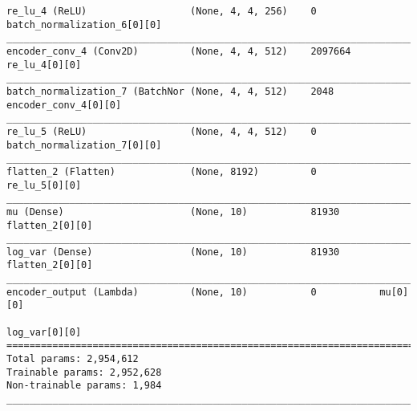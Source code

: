 \begin{lstlisting}[caption={dSprites-VAE-GAN Encoder},captionpos=b,basicstyle=\tiny, label={lst:mnist-vae-encoder}]
re_lu_4 (ReLU)                  (None, 4, 4, 256)    0           batch_normalization_6[0][0]
__________________________________________________________________________________________________
encoder_conv_4 (Conv2D)         (None, 4, 4, 512)    2097664     re_lu_4[0][0]
__________________________________________________________________________________________________
batch_normalization_7 (BatchNor (None, 4, 4, 512)    2048        encoder_conv_4[0][0]
__________________________________________________________________________________________________
re_lu_5 (ReLU)                  (None, 4, 4, 512)    0           batch_normalization_7[0][0]
__________________________________________________________________________________________________
flatten_2 (Flatten)             (None, 8192)         0           re_lu_5[0][0]
__________________________________________________________________________________________________
mu (Dense)                      (None, 10)           81930       flatten_2[0][0]
__________________________________________________________________________________________________
log_var (Dense)                 (None, 10)           81930       flatten_2[0][0]
__________________________________________________________________________________________________
encoder_output (Lambda)         (None, 10)           0           mu[0][0]
                                                                 log_var[0][0]
==================================================================================================
Total params: 2,954,612
Trainable params: 2,952,628
Non-trainable params: 1,984
__________________________________________________________________________________________________
\end{lstlisting}
